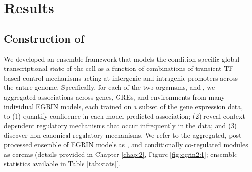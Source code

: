 \section{Results}

\subsection{Construction of \egrine} 

We developed an ensemble-framework that models the condition-specific global transcriptional state of the cell as a function of combinations of transient TF-based control mechanisms acting at intergenic and intragenic promoters across the entire genome. Specifically, for each of the two orgainsms, \halo and \eco, we aggregated associations across genes, GREs, and environments from many individual EGRIN models, each trained on a subset of the gene expression data, to (1) quantify confidence in each model-predicted association; (2) reveal context-dependent regulatory mechanisms that occur infrequently in the data; and (3) discover non-canonical regulatory mechanisms. We refer to the aggregated, post-processed ensemble of EGRIN models as \egrine, and conditionally co-regulated modules as corems (details provided in Chapter \ref{chap:2}, Figure \ref{fig:egrin2:1}; ensemble statistics available in Table \ref{tab:stats}). 

